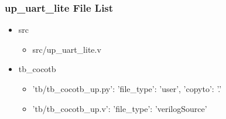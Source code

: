 \subsubsection{up\_uart\_lite File List}
\begin{itemize}
\item src
	\begin{itemize}
	\item src/up\_uart\_lite.v
	\end{itemize}
\item tb\_cocotb
	\begin{itemize}
	\item {'tb/tb\_cocotb\_up.py': {'file\_type': 'user', 'copyto': '.'}}
	\item {'tb/tb\_cocotb\_up.v': {'file\_type': 'verilogSource'}}
	\end{itemize}
\end{itemize}
